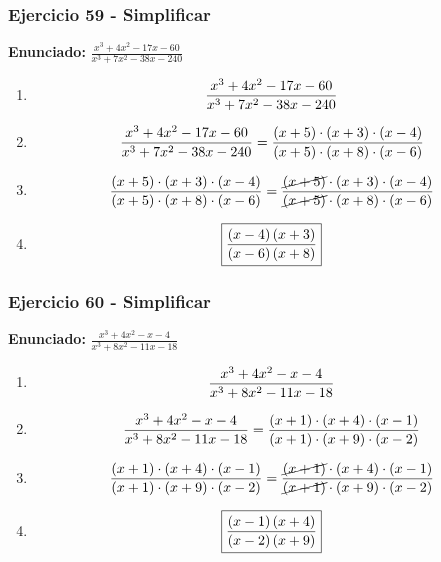 \documentclass[11pt,a4paper]{article}
\newcommand{\fitmath}[1]{%
\[
\setbox0=\hbox{$\displaystyle #1$}%
\ifdim\wd0>\linewidth
\resizebox{\linewidth}{!}{$\displaystyle #1$}%
\else
#1%
\fi
\]
}
\begin{document}
\vspace{0.12cm}
\subsubsection*{Ejercicio 59 - Simplificar}
\textbf{Enunciado:} $ \frac{x^{3} + 4 x^{2} - 17 x - 60}{x^{3} + 7 x^{2} - 38 x - 240} $\par
\begin{enumerate}[leftmargin=2em]
\item \fitmath{\frac{x^{3} + 4 x^{2} - 17 x - 60}{x^{3} + 7 x^{2} - 38 x - 240}}
\item \fitmath{\frac{x^{3} + 4 x^{2} - 17 x - 60}{x^{3} + 7 x^{2} - 38 x - 240}=\frac{\left(x + 5\right)\cdot \left(x + 3\right)\cdot \left(x - 4\right)}{\left(x + 5\right)\cdot \left(x + 8\right)\cdot \left(x - 6\right)}}
\item \fitmath{\frac{\left(x + 5\right)\cdot \left(x + 3\right)\cdot \left(x - 4\right)}{\left(x + 5\right)\cdot \left(x + 8\right)\cdot \left(x - 6\right)}=\frac{\cancel{\left(x + 5\right)}\cdot \left(x + 3\right)\cdot \left(x - 4\right)}{\cancel{\left(x + 5\right)}\cdot \left(x + 8\right)\cdot \left(x - 6\right)}}
\item \fitmath{\boxed{\frac{\left(x - 4\right) \left(x + 3\right)}{\left(x - 6\right) \left(x + 8\right)}}}
\end{enumerate}

\vspace{0.12cm}
\subsubsection*{Ejercicio 60 - Simplificar}
\textbf{Enunciado:} $ \frac{x^{3} + 4 x^{2} - x - 4}{x^{3} + 8 x^{2} - 11 x - 18} $\par
\begin{enumerate}[leftmargin=2em]
\item \fitmath{\frac{x^{3} + 4 x^{2} - x - 4}{x^{3} + 8 x^{2} - 11 x - 18}}
\item \fitmath{\frac{x^{3} + 4 x^{2} - x - 4}{x^{3} + 8 x^{2} - 11 x - 18}=\frac{\left(x + 1\right)\cdot \left(x + 4\right)\cdot \left(x - 1\right)}{\left(x + 1\right)\cdot \left(x + 9\right)\cdot \left(x - 2\right)}}
\item \fitmath{\frac{\left(x + 1\right)\cdot \left(x + 4\right)\cdot \left(x - 1\right)}{\left(x + 1\right)\cdot \left(x + 9\right)\cdot \left(x - 2\right)}=\frac{\cancel{\left(x + 1\right)}\cdot \left(x + 4\right)\cdot \left(x - 1\right)}{\cancel{\left(x + 1\right)}\cdot \left(x + 9\right)\cdot \left(x - 2\right)}}
\item \fitmath{\boxed{\frac{\left(x - 1\right) \left(x + 4\right)}{\left(x - 2\right) \left(x + 9\right)}}}
\end{enumerate}
\end{document}
